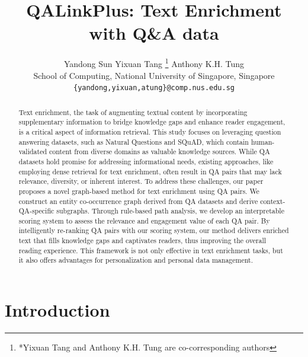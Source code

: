 \documentclass[11pt]{article}
\title{QALinkPlus: Text Enrichment with Q\&A data}
\author{ Yandong Sun
\hspace{2em}  Yixuan Tang \thanks{*Yixuan Tang and Anthony K.H. Tung are co-corresponding authors}
\hspace{2em}  Anthony K.H. Tung  \footnotemark[1]\\
School of Computing, National University of Singapore, Singapore \\
\texttt{\small\{yandong,yixuan,atung\}@comp.nus.edu.sg}\\
}
\begin{document}
\maketitle

\begin{abstract}
Text enrichment, the task of augmenting textual content by incorporating supplementary information to bridge knowledge gaps and enhance reader engagement, is a critical aspect of information retrieval. This study focuses on leveraging question answering datasets, such as Natural Questions and SQuAD, which contain human-validated content from diverse domains as valuable knowledge sources. While QA datasets hold promise for addressing informational needs, existing approaches, like employing dense retrieval for text enrichment, often result in QA pairs that may lack relevance, diversity, or inherent interest. To address these challenges, our paper proposes a novel graph-based method for text enrichment using QA pairs. We construct an entity co-occurrence graph derived from QA datasets and derive context-QA-specific subgraphs. Through rule-based path analysis, we develop an interpretable scoring system to assess the relevance and engagement value of each QA pair. By intelligently re-ranking QA pairs with our scoring system, our method delivers enriched text that fills knowledge gaps and captivates readers, thus improving the overall reading experience. This framework is not only effective in text enrichment tasks, but it also offers advantages for personalization and personal data management.
\end{abstract}
% 

\section{Introduction}
\label{sec:intro}
\end{document}
